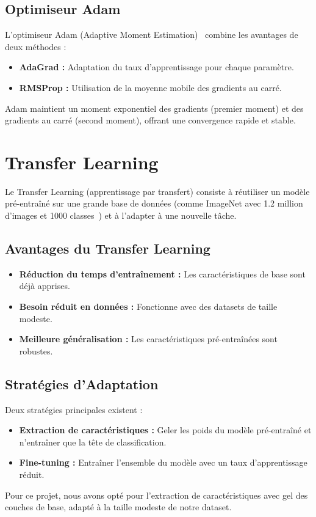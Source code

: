 \documentclass[12pt,a4paper]{report}
\begin{document}
\subsection{Optimiseur Adam}
L'optimiseur Adam (Adaptive Moment Estimation)~\cite{kingma2014adam} combine les avantages de deux méthodes :
\begin{itemize}
    \item \textbf{AdaGrad :} Adaptation du taux d'apprentissage pour chaque paramètre.
    \item \textbf{RMSProp :} Utilisation de la moyenne mobile des gradients au carré.
\end{itemize}
Adam maintient un moment exponentiel des gradients (premier moment) et des gradients au carré (second moment), offrant une convergence rapide et stable.

\section{Transfer Learning}
Le Transfer Learning (apprentissage par transfert) consiste à réutiliser un modèle pré-entraîné sur une grande base de données (comme ImageNet avec 1.2 million d'images et 1000 classes~\cite{deng2009}) et à l'adapter à une nouvelle tâche.

\subsection{Avantages du Transfer Learning}
\begin{itemize}
    \item \textbf{Réduction du temps d'entraînement :} Les caractéristiques de base sont déjà apprises.
    \item \textbf{Besoin réduit en données :} Fonctionne avec des datasets de taille modeste.
    \item \textbf{Meilleure généralisation :} Les caractéristiques pré-entraînées sont robustes.
\end{itemize}

\subsection{Stratégies d'Adaptation}
Deux stratégies principales existent :
\begin{itemize}
    \item \textbf{Extraction de caractéristiques :} Geler les poids du modèle pré-entraîné et n'entraîner que la tête de classification.
    \item \textbf{Fine-tuning :} Entraîner l'ensemble du modèle avec un taux d'apprentissage réduit.
\end{itemize}
Pour ce projet, nous avons opté pour l'extraction de caractéristiques avec gel des couches de base, adapté à la taille modeste de notre dataset.
\end{document}
